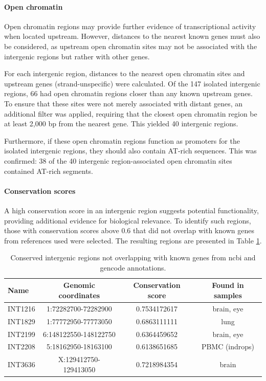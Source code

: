 \paragraph{Open chromatin}

Open chromatin regions may provide further evidence of transcriptional activity when located upstream.
However, distances to the nearest known genes must also be considered,
as upstream open chromatin sites may not be associated with the intergenic regions but rather with other genes.

For each intergenic region, distances to the nearest open chromatin sites and upstream genes (strand-unspecific) were calculated.
Of the 147 isolated intergenic regions, 66 had open chromatin regions closer than any known upstream genes.
To ensure that these sites were not merely associated with distant genes, an additional filter was applied, 
requiring that the closest open chromatin region be at least 2,000 bp from the nearest gene.
This yielded 40 intergenic regions.

Furthermore, if these open chromatin regions function as promoters for the isolated intergenic regions, they should also contain AT-rich sequences.
This was confirmed: 38 of the 40 intergenic region-associated open chromatin sites contained AT-rich segments.

\paragraph{Conservation scores}

A high conservation score in an intergenic region suggests potential functionality, providing additional evidence for biological relevance.
To identify such regions, those with conservation scores above 0.6 that did not overlap with known genes from references used were selected.
The resulting regions are presented in Table \ref{tab:conservedIntergenic}.

\begin{table}[h]
    \centering
    \begin{tabular}{lccc}
        \toprule
        Name & Genomic coordinates & Conservation score & Found in samples \\
        \midrule
        INT1216 & 1:72282700-72282900 & 0.7534172617 & brain, eye\\
	INT1829 & 1:77772950-77773050 & 0.6863111111 & lung \\
	INT2199 & 6:148122550-148122750 & 0.6364459652 & brain, eye \\
	INT2208 & 5:18162950-18163100 & 0.6138651685 & PBMC (indrops) \\
	INT3636 & X:129412750-129413050 & 0.7218984354 & brain \\
        \bottomrule
    \end{tabular}
    \caption{Conserved intergenic regions not overlapping with known genes from ncbi and gencode annotations.}
    \label{tab:conservedIntergenic}
\end{table}


